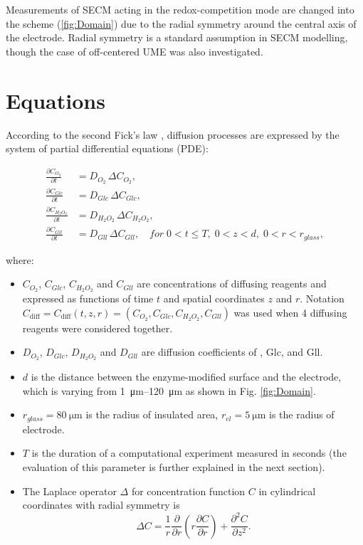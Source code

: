 Measurements of SECM acting in the redox-competition mode are changed into the scheme (\ref{fig:Domain}) due to the radial symmetry around the central axis of the electrode. Radial symmetry is a standard assumption in SECM modelling, though the case of off-centered UME was also investigated.


\section{Equations}  \label{sec:equations}
According to the second Fick’s law , diffusion processes are expressed by the system of partial differential equations (PDE):

\begin{equation}
  \begin{aligned}\label{eq:reakc_eq1}
  \frac{\partial C_{O_2}}{\partial t} &= D_{O_2}\,\Delta C_{O_2},\\
  \frac{\partial C_{Glc}}{\partial t} &= D_{Glc}\,\Delta C_{Glc},\\
  \frac{\partial C_{H_2 O_2}}{\partial t} &= D_{H_2 O_2} \,\Delta C_{H_2 O_2},\\
  \frac{\partial C_{Gll}}{\partial t} &= D_{Gll}\,\Delta C_{Gll},  \quad for\; 0<t\leq T,\; 0<z<d,\; 0<r<r_{glass},
  \end{aligned}
\end{equation}

where:
\begin{itemize}
  \item[] $C_{O_2}$, $C_{Glc}$, $C_{H_2 O_2}$ and $ C_{Gll}$ are concentrations of diffusing reagents and expressed as functions of time $t$ and spatial coordinates $z$ and $r$. Notation $C_{\text{diff}} = C_{\text{diff}} \left( t, z, r \right) = \left( C_{O_2}, C_{Glc}, \allowbreak C_{H_2 O_2}, \allowbreak C_{Gll} \right)$ was used when 4 diffusing re\-agents were considered together.
  \item[] $D_{O_2}$, $D_{Glc}$, $D_{H_2 O_2}$ and $D_{Gll}$ are diffusion coefficients of , Glc,  and Gll.
  \item[] $d$ is the distance between the enzyme-modified surface and the electrode, which is varying from \SIrange{1}{120}{\um} as shown in Fig. \ref{fig:Domain}.
  \item[] $r_{glass} = \SI{80}{\um}$ is the radius of insulated area, $r_{el} = \SI{5}{\um}$ is the radius of electrode.
  \item[] $T$ is the duration of a computational experiment measured in seconds (the evaluation of this parameter is further explained in the next section).
  \item[] The Laplace operator $\Delta$ for concentration function $C$ in cylindrical coordinates with radial symmetry is
  \begin{equation*}
  \Delta C = \frac{1}{r}\frac{\partial }{\partial r} \left( r\frac{\partial C }{\partial r} \right) + \frac{\partial^{2} C}{\partial z^{2}}.
  \end{equation*}
\end{itemize}


